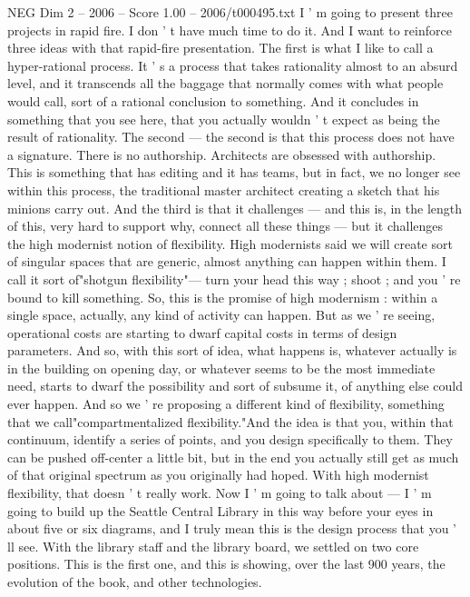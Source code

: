\begin{textsample}{NEG Dim 2 – 2006 – Score 1.00 – 2006/t000495.txt}  \label{ex:f2_neg_011}
I ' m going to present three projects in rapid fire.
I don ' t have much time to do it.
And I want to reinforce three ideas with that rapid-fire presentation.
The first is what I like to call a hyper-rational process.
It ' s a process that takes rationality almost to an absurd level, and it transcends all the baggage that normally comes with what people would call, sort of a rational conclusion to something.
And it concludes in something that you see here, that you actually wouldn ' t expect as being the result of rationality.
The second — the second is that this process does not have a signature.
There is no authorship.
Architects are obsessed with authorship.
This is something that has editing and it has teams, but in fact, we no longer see within this process, the traditional master architect creating a sketch that his minions carry out.
And the third is that it challenges — and this is, in the length of this, very hard to support why, connect all these things — but it challenges the high modernist notion of flexibility.
High modernists said we will create sort of singular spaces that are generic, almost anything can happen within them.
I call it sort of"shotgun flexibility"— turn your head this way ; shoot ; and you ' re bound to kill something.
So, this is the promise of high modernism : within a single space, actually, any kind of activity can happen.
But as we ' re seeing, operational costs are starting to dwarf capital costs in terms of design parameters.
And so, with this sort of idea, what happens is, whatever actually is in the building on opening day, or whatever seems to be the most immediate need, starts to dwarf the possibility and sort of subsume it, of anything else could ever happen.
And so we ' re proposing a different kind of flexibility, something that we call"compartmentalized flexibility."And the idea is that you, within that continuum, identify a series of points, and you design specifically to them.
They can be pushed off-center a little bit, but in the end you actually still get as much of that original spectrum as you originally had hoped.
With high modernist flexibility, that doesn ' t really work.
Now I ' m going to talk about — I ' m going to build up the Seattle Central Library in this way before your eyes in about five or six diagrams, and I truly mean this is the design process that you ' ll see.
With the library staff and the library board, we settled on two core positions.
This is the first one, and this is showing, over the last 900 years, the evolution of the book, and other technologies.

\end{textsample}
